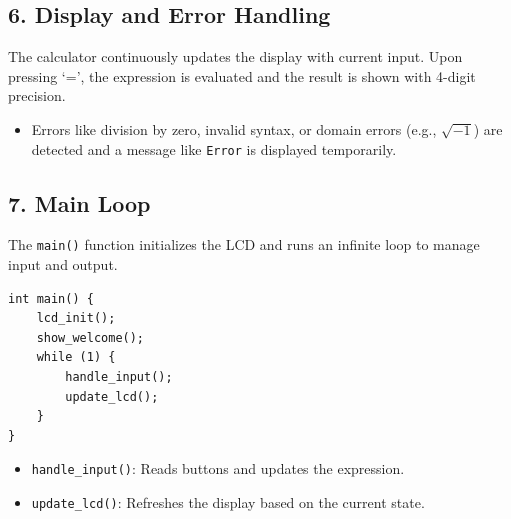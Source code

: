 \documentclass{article}
\theoremstyle{remark}
\begin{document}
\subsection{6. Display and Error Handling}

The calculator continuously updates the display with current input. Upon pressing `=', the expression is evaluated and the result is shown with 4-digit precision.

\begin{itemize}
    \item Errors like division by zero, invalid syntax, or domain errors (e.g., $\sqrt{-1}$) are detected and a message like \texttt{Error} is displayed temporarily.
\end{itemize}

\subsection{7. Main Loop}

The \texttt{main()} function initializes the LCD and runs an infinite loop to manage input and output.

\begin{verbatim}
int main() {
    lcd_init();
    show_welcome();
    while (1) {
        handle_input();
        update_lcd();
    }
}
\end{verbatim}

\begin{itemize}
    \item \texttt{handle\_input()}: Reads buttons and updates the expression.
    \item \texttt{update\_lcd()}: Refreshes the display based on the current state.
\end{itemize}
\end{document}
